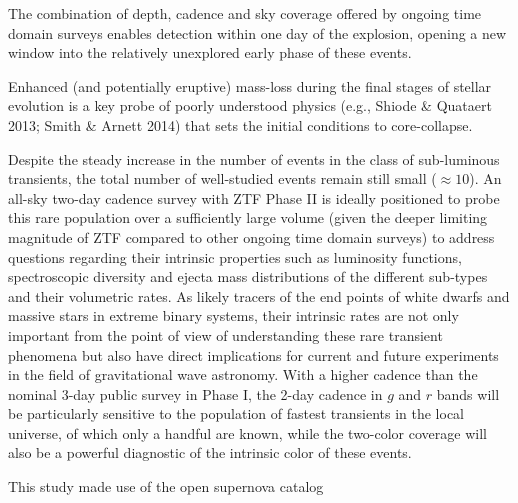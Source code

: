 \documentclass[twocolumn]{aastex63}
\begin{document}
\begin{CJK*}{UTF8}{gbsn}
The combination of depth, cadence and sky coverage offered by ongoing time domain surveys enables 
detection within one day of the explosion, opening a new window into the relatively unexplored early 
phase of these events. 

Enhanced (and potentially eruptive) mass-loss during the final stages of stellar evolution is a key probe 
of poorly understood physics (e.g., Shiode \& Quataert 2013; Smith \& Arnett 2014) that sets the initial 
conditions to core-collapse. 

Despite the steady increase in the number of events in the class of sub-luminous transients, the total 
number of well-studied events remain still small ($\approx 10$). An all-sky two-day cadence survey 
with ZTF Phase II is ideally positioned to probe this rare population over a sufficiently large volume 
(given the deeper limiting magnitude of ZTF compared to other ongoing time domain surveys) to 
address questions regarding their intrinsic properties such as luminosity functions, spectroscopic 
diversity and ejecta mass distributions of the different sub-types and their volumetric rates. As likely 
tracers of the end points of white dwarfs and massive stars in extreme binary systems, their intrinsic 
rates are not only important from the point of view of understanding these rare transient phenomena 
but also have direct implications for current and future experiments in the field of gravitational wave 
astronomy. With a higher cadence than the nominal 3-day public survey in Phase I, the 2-day cadence 
in $g$ and $r$ bands will be particularly sensitive to the population of fastest transients in the local 
universe, of which only a handful are known, while the two-color coverage will also be a powerful 
diagnostic of the intrinsic color of these events.


\acknowledgements

This study made use of the open supernova catalog \citep{Guillochon2017}



\end{CJK*}
\end{document}

